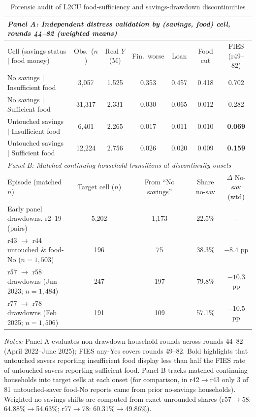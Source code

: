 \documentclass[11pt]{article}
\begin{document}
\begin{table}[tbp]
\centering
\caption{Forensic audit of L2CU food-sufficiency and savings-drawdown discontinuities}
\label{tab:forensic}
\scriptsize
\setlength{\tabcolsep}{3.5pt}
\begin{tabular}{lcccccc}
\toprule
\multicolumn{7}{l}{\textit{Panel A: Independent distress validation by (savings, food) cell, rounds 44--82 (weighted means)}} \\
\midrule
Cell (savings status $\mid$ food money) & Obs.\ ($n$) & Real $Y$ (M) & Fin.\ worse & Loan & Food cut & FIES (r49--82) \\
\midrule
No savings $\mid$ Insufficient food & 3,057 & 1.525 & 0.353 & 0.457 & 0.418 & 0.702 \\
No savings $\mid$ Sufficient food & 31,317 & 2.331 & 0.030 & 0.065 & 0.012 & 0.282 \\
Untouched savings $\mid$ Insufficient food & 6,401 & 2.265 & 0.017 & 0.011 & 0.010 & \textbf{0.069} \\
Untouched savings $\mid$ Sufficient food & 12,224 & 2.756 & 0.026 & 0.020 & 0.009 & \textbf{0.159} \\
\midrule
\multicolumn{7}{l}{\textit{Panel B: Matched continuing-household transitions at discontinuity onsets}} \\
\midrule
Episode (matched $n$) & \multicolumn{2}{c}{Target cell ($n$)} & \multicolumn{2}{c}{From ``No savings''} & Share no-sav & $\Delta$ No-sav (wtd) \\
\midrule
Early panel drawdowns, r2--19 (pairs) & \multicolumn{2}{c}{5,202} & \multicolumn{2}{c}{1,173} & 22.5\% & -- \\
r43 $\to$ r44 untouched \& food-No ($n = 1{,}503$) & \multicolumn{2}{c}{196} & \multicolumn{2}{c}{75} & 38.3\% & $-8.4$ pp \\
r57 $\to$ r58 drawdowns (Jun 2023; $n = 1{,}484$) & \multicolumn{2}{c}{247} & \multicolumn{2}{c}{197} & 79.8\% & $-10.3$ pp \\
r77 $\to$ r78 drawdowns (Feb 2025; $n = 1{,}506$) & \multicolumn{2}{c}{191} & \multicolumn{2}{c}{109} & 57.1\% & $-10.5$ pp \\
\bottomrule
\end{tabular}
\begin{flushleft}
\footnotesize\textit{Notes:} Panel A evaluates non-drawdown household-rounds across rounds 44--82 (April 2022--June 2025); FIES any-Yes covers rounds 49--82. Bold highlights that untouched savers reporting insufficient food display less than half the FIES rate of untouched savers reporting sufficient food. Panel B tracks matched continuing households into target cells at each onset (for comparison, in r42$\to$r43 only 3 of 81 untouched-saver food-No reports came from prior no-savings households). Weighted no-savings shifts are computed from exact unrounded shares (r57$\to$58: 64.88\%$\to$54.63\%; r77$\to$78: 60.31\%$\to$49.86\%).
\end{flushleft}
\end{table}
\end{document}
